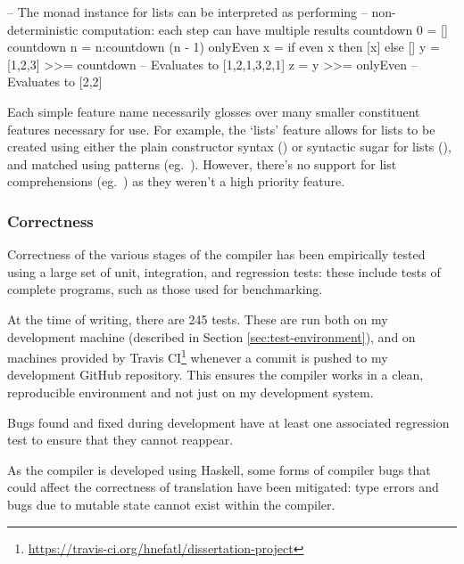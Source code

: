\documentclass[dissertation.tex]{subfiles}
\begin{document}
{\begin{haskellfigure}
    -- The monad instance for lists can be interpreted as performing
    -- non-deterministic computation: each step can have multiple results
    countdown 0 = []
    countdown n = n:countdown (n - 1)
    onlyEven x = if even x then [x] else []
    y = [1,2,3] >>= countdown -- Evaluates to [1,2,1,3,2,1]
    z = y >>= onlyEven -- Evaluates to [2,2]
    \end{haskellfigure}

    Each simple feature name necessarily glosses over many smaller constituent features necessary for use. For example,
    the `lists' feature allows for lists to be created using either the plain constructor syntax
    () or syntactic sugar for lists (\haskell{[1,2,3]}), and matched using patterns (eg.\
    \haskell{[x,y] = [1,2]}). However, there's no support for list comprehensions (eg.\ \haskell{[f x | x <- [1,2,3],
    even x]}) as they weren't a high priority feature.


    
    \subsubsection{Correctness}
    {

        Correctness of the various stages of the compiler has been empirically tested using a large set of unit,
        integration, and regression tests: these include tests of complete programs, such as those used for
        benchmarking.
        
        At the time of writing, there are 245 tests. These are run both on my development machine
        (described in Section \ref{sec:test-environment}), and on machines provided by Travis
        CI\footnote{\url{https://travis-ci.org/hnefatl/dissertation-project}} whenever a commit is pushed to my
        development GitHub repository. This ensures the compiler works in a clean, reproducible environment and not just
        on my development system.

        Bugs found and fixed during development have at least one associated regression test to ensure that they cannot
        reappear.

        As the compiler is developed using Haskell, some forms of compiler bugs that could affect the correctness of
        translation have been mitigated: type errors and bugs due to mutable state cannot exist within the compiler.

    }
}
\end{document}
